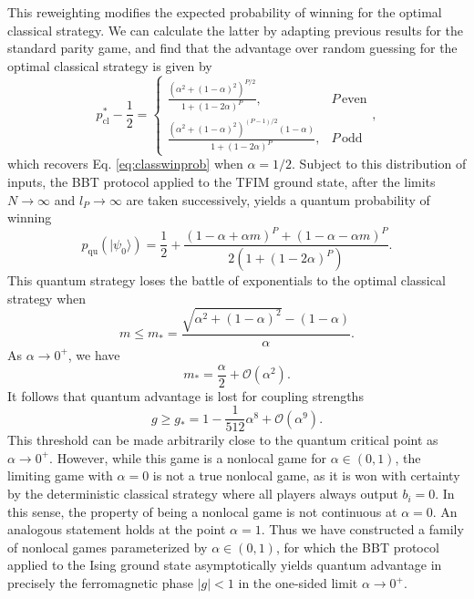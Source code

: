 \documentclass[prb,twocolumn,showpacs,amssymb,superscriptaddress]{revtex4-2}
\begin{document}
This reweighting modifies the expected probability of winning for the optimal classical strategy. We can calculate the latter by adapting previous results for the standard parity game\cite{brassard2005recasting}, and find that the advantage over random guessing for the optimal classical strategy is given by
\begin{equation}
\label{eq:alphaclass}
p_{\mathrm{cl}}^* - \frac{1}{2} = \begin{cases}
\frac{(\alpha^2 + (1-\alpha)^2)^{P/2}}{1+(1-2\alpha)^P}, & P \, \mathrm{even} \\
\frac{(\alpha^2 + (1-\alpha)^2)^{ (P-1)/2}(1-\alpha)}{1+(1-2\alpha)^P}, & P \, \mathrm{odd}
\end{cases},
\end{equation}
which recovers Eq. \eqref{eq:classwinprob} when $\alpha=1/2$. Subject to this distribution of inputs, the BBT protocol applied to the TFIM ground state, after the limits $N \to \infty$ and $l_P \to \infty$ are taken successively, yields a quantum probability of winning
\begin{equation}
p_{\mathrm{qu}}(|\psi_0\rangle) = \frac{1}{2}+ \frac{(1-\alpha + \alpha m)^P +(1-\alpha - \alpha m)^P}{2(1+(1-2\alpha)^P)}.
\end{equation}
This quantum strategy loses the battle of exponentials to the optimal classical strategy when
\begin{equation}
m \leq m_* = \frac{\sqrt{\alpha^2+(1-\alpha)^2}-(1-\alpha)}{\alpha}.
\end{equation}
As $\alpha \to 0^+$, we have
\begin{equation}
\label{eq:magthresh}
m_* = \frac{\alpha}{2} + \mathcal{O}(\alpha^2).
\end{equation}
It follows that quantum advantage is lost for coupling strengths
\begin{equation}
g \geq g_* = 1 - \frac{1}{512}\alpha^8 + \mathcal{O}(\alpha^{9}).
\end{equation}
This threshold can be made arbitrarily close to the quantum critical point as $\alpha \to 0^+$. However, while this game is a nonlocal game for $\alpha \in (0,1)$, the limiting game with $\alpha=0$ is not a true nonlocal game, as it is won with certainty by the deterministic classical strategy where all players always output $b_i=0$. In this sense, the property of being a nonlocal game is not continuous at $\alpha=0$. An analogous statement holds at the point $\alpha =1$. Thus we have constructed a family of nonlocal games parameterized by $\alpha \in (0,1)$, for which the BBT protocol applied to the Ising ground state asymptotically yields quantum advantage in precisely the ferromagnetic phase $|g| <1$ in the one-sided limit $\alpha \to 0^+$. 
\end{document}
